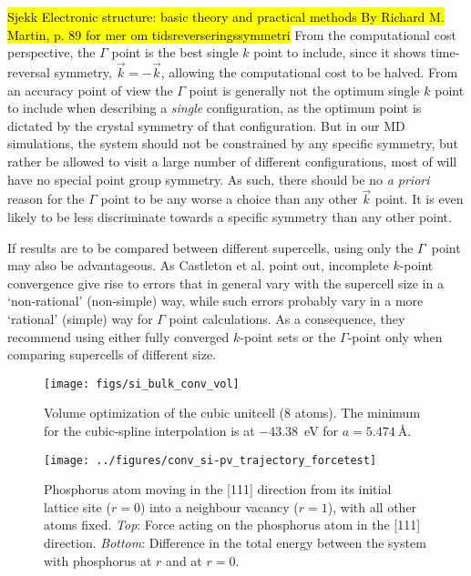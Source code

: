 \documentclass[11pt,bibliography=totoc,index=totoc]{scrbook}   %
\newcommand{\comment}[1]{\hl{#1}}
\begin{document}
\comment{Sjekk 
Electronic structure: basic theory and practical methods By Richard M. Martin, p. 89 for mer om tidsreverseringssymmetri}
From the computational cost perspective, the $\Gamma$ point is the best single $k$ point to include, since it shows time-reversal symmetry, 
$\vec{k}=-\vec{k}$, allowing the computational cost to be halved. 
From an accuracy point of view the $\Gamma$ point is generally not the optimum single $k$ point to include when describing a \emph{single} configuration, as the optimum point is dictated by the crystal symmetry of that configuration\cite{Baldereschi:1973}. 
But in our MD simulations, the system should not be constrained by any specific symmetry, but rather be allowed to visit a large number of different configurations, most of will have no special point group symmetry. 
As such, there should be no \textit{a priori} reason for the $\Gamma$ point to be any worse a choice than any other $\vec{k}$ point. 
It is even likely to be less discriminate towards a specific symmetry than any other point.

If results are to be compared between different supercells, using only the $\Gamma$~point may also be advantageous.
As Castleton et al. point out\cite{Castleton:2009}, incomplete $k$-point convergence give rise to errors that in general vary with the supercell size in a `non-rational' (non-simple) way, while such errors probably vary in a more `rational' (simple) way for $\Gamma$ point calculations. 
As a consequence, they recommend using either fully converged $k$-point sets or the $\Gamma$-point only when comparing supercells of different size.


\begin{figure}[htbp]
  \begin{center}
    \texttt{[image: figs/si\_bulk\_conv\_vol]}
  \end{center}
  \caption{
     Volume optimization of the cubic unitcell (8 atoms). 
     The minimum for the cubic-spline interpolation is at
     \SI{-43.38}{\electronvolt} for $a=\SI{5.474}{\angstrom}$.
  }
  \label{fig:si_bulk_conv_vol}
\end{figure}



\begin{figure}[htbp]
  \begin{center}
    \texttt{[image: ../figures/conv\_si-pv\_trajectory\_forcetest]}
  \end{center}
  \caption{Phosphorus atom moving in the [111] direction from its initial lattice site ($r=0$) into a neighbour vacancy ($r=1$),
    with all other atoms fixed.
    \textit{Top}: Force acting on the phosphorus atom in the [111] direction. 
    \textit{Bottom}: Difference in the total energy between the system with phosphorus at $r$ and at $r=0$.
    }
  \label{fig:conv_si-pv_trajectory_forcetest}
\end{figure}
\end{document}
